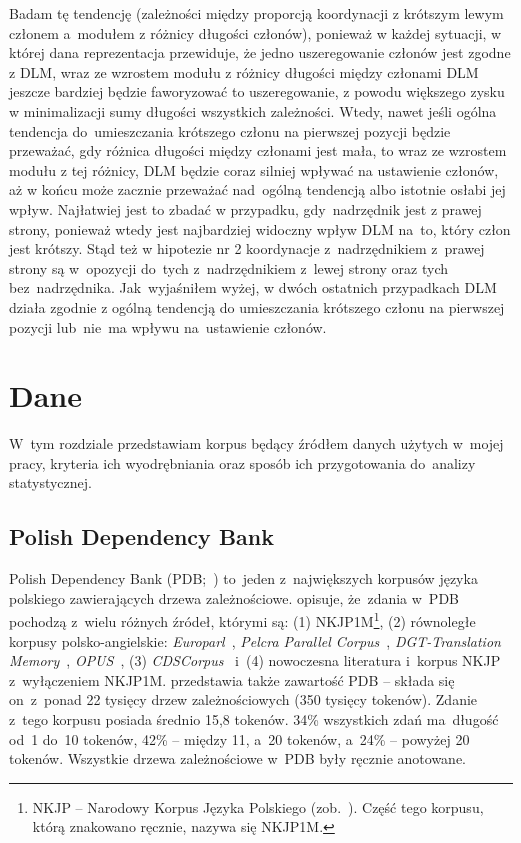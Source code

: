 \documentclass[licencjacka]{pracamgr_Kogni}
\begin{document}
    Badam tę tendencję (zależności między proporcją koordynacji z krótszym lewym członem a~modułem z różnicy długości członów), ponieważ w każdej sytuacji, w której dana reprezentacja przewiduje, że jedno uszeregowanie członów jest zgodne z DLM, wraz ze wzrostem modułu z różnicy długości między członami DLM jeszcze bardziej będzie faworyzować to uszeregowanie, z powodu większego zysku w minimalizacji sumy długości wszystkich zależności.
    Wtedy, nawet jeśli ogólna tendencja do~umieszczania krótszego członu na pierwszej pozycji będzie przeważać, gdy różnica długości między członami jest mała, to wraz ze wzrostem modułu z tej różnicy, DLM będzie coraz silniej wpływać na ustawienie członów, aż w końcu może zacznie przeważać nad~ogólną tendencją albo istotnie osłabi jej wpływ.
    Najłatwiej jest to zbadać w przypadku, gdy~nadrzędnik jest z prawej strony, ponieważ wtedy jest najbardziej widoczny wpływ DLM na~to, który człon jest krótszy.
    Stąd też w hipotezie nr 2 koordynacje z~nadrzędnikiem z~prawej strony są w~opozycji do~tych z~nadrzędnikiem z~lewej strony oraz tych bez~nadrzędnika.
    Jak~wyjaśniłem wyżej, w dwóch ostatnich przypadkach DLM działa zgodnie z ogólną tendencją do umieszczania krótszego członu na pierwszej pozycji lub~nie~ma wpływu na~ustawienie członów.

    \chapter{Dane}\label{ch:dane}
    W~tym rozdziale przedstawiam korpus będący źródłem danych użytych w~mojej pracy, kryteria ich wyodrębniania oraz sposób ich przygotowania do~analizy statystycznej.


    \section{Polish Dependency Bank}\label{sec:polish-dependency-bank}

    Polish Dependency Bank (PDB;~\citealp{Wroblewska2014}) to~jeden z~największych korpusów języka polskiego zawierających drzewa zależnościowe. \citet{Wroblewska2020} opisuje, że~zdania w~PDB pochodzą z~wielu różnych źródeł, którymi są: (1) NKJP1M\footnote{NKJP -- Narodowy Korpus Języka Polskiego (zob.~\citealt{Przepiorkowski2012}). Część tego korpusu, którą znakowano ręcznie, nazywa się NKJP1M.}, (2) równoległe korpusy polsko-angielskie: \textit{Europarl}~\citep{Koehn2005}, \textit{Pelcra Parallel Corpus}~\citep{Pezik2011}, \textit{DGT-Translation Memory}~\citep{Steinberger2012}, \textit{OPUS}~\citep{Tiedemann2012}, (3) \textit{CDSCorpus}~\citep{Wroblewska2017} i~(4) nowoczesna literatura i~korpus NKJP z~wyłączeniem NKJP1M\@.
    \citet{Wroblewska2020} przedstawia także zawartość PDB -- składa się on~z~ponad 22 tysięcy drzew zależnościowych (350 tysięcy tokenów).
    Zdanie z~tego korpusu posiada średnio 15,8 tokenów.
    34\% wszystkich zdań ma~długość od~1 do~10 tokenów, 42\% -- między 11, a~20 tokenów, a~24\% -- powyżej 20 tokenów.
    Wszystkie drzewa zależnościowe w~PDB były ręcznie anotowane.
\end{document}
